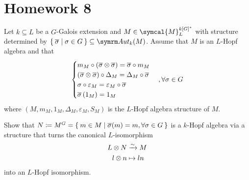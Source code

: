 \section*{Homework 8}

\setcounter{exercise}{0}

\begin{exercise}
Let \(k \subseteq L\) be a \(G\)-Galois extension and \(M \in \symcal{M}_{L}^{k[G]^{*}}\) with structure determined by \(\Set{ \overline{\sigma} | \sigma \in G } \subseteq \Aut_k (M)\). Assume that \(M\) is an \(L\)-Hopf algebra and that
\[
\begin{cases}
    m_{M} \circ (\overline{\sigma} \otimes \overline{\sigma}) = \overline{\sigma} \circ m_{M} \\
    (\overline{\sigma} \otimes \overline{\sigma}) \circ \Delta_M = \Delta_M \circ \overline{\sigma} \\
    \sigma \circ \varepsilon_M = \varepsilon_M \circ \overline{\sigma} \\
    \overline{\sigma} \left(1_M\right) = 1_M
\end{cases}, \forall \sigma \in G
\]
where \(\left(M, m_M, 1_M, \Delta_M, \varepsilon_M, S_M\right)\) is the \(L\)-Hopf algebra structure of \(M\).

Show that \(N \coloneq M^G = \Set{ m \in M | \overline{\sigma} (m) = m, \forall \sigma \in G }\) is a \(k\)-Hopf algebra via a structure that turns the canonical \(L\)-isomorphism
\begin{align*}
    L \otimes N &\xrightarrow{\sim} M \\
    l \otimes n &\mapsto ln
\end{align*}
into an \(L\)-Hopf isomorphism.
\end{exercise}
